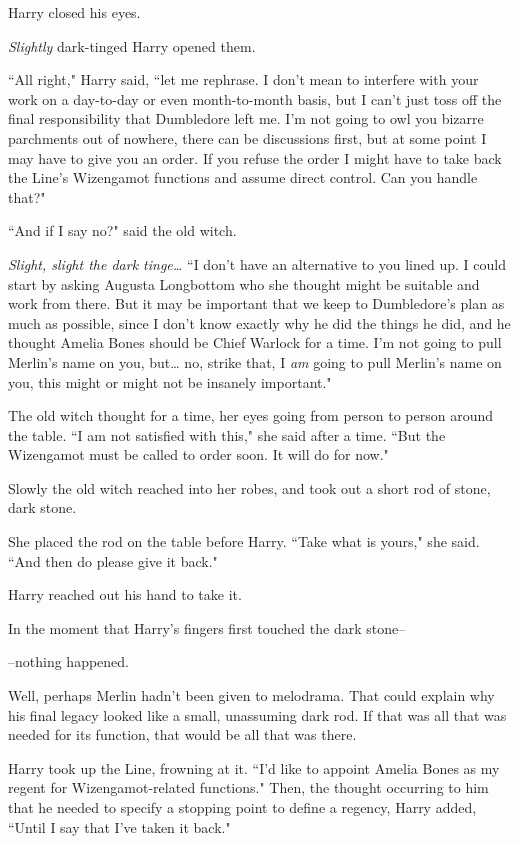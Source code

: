 Harry closed his eyes.

\emph{Slightly} dark-tinged Harry opened them.

``All right," Harry said, ``let me rephrase. I don't mean to interfere with your work on a day-to-day or even month-to-month basis, but I can't just toss off the final responsibility that Dumbledore left me. I'm not going to owl you bizarre parchments out of nowhere, there can be discussions first, but at some point I may have to give you an order. If you refuse the order I might have to take back the Line's Wizengamot functions and assume direct control. Can you handle that?"

``And if I say no?" said the old witch.

\emph{Slight, slight the dark tinge{\ldots}} ``I don't have an alternative to you lined up. I could start by asking Augusta Longbottom who she thought might be suitable and work from there. But it may be important that we keep to Dumbledore's plan as much as possible, since I don't know exactly why he did the things he did, and he thought Amelia Bones should be Chief Warlock for a time. I'm not going to pull Merlin's name on you, but{\ldots} no, strike that, I \emph{am} going to pull Merlin's name on you, this might or might not be insanely important."

The old witch thought for a time, her eyes going from person to person around the table. ``I am not satisfied with this," she said after a time. ``But the Wizengamot must be called to order soon. It will do for now."

Slowly the old witch reached into her robes, and took out a short rod of stone, dark stone.

She placed the rod on the table before Harry. ``Take what is yours," she said. ``And then do please give it back."

Harry reached out his hand to take it.

In the moment that Harry's fingers first touched the dark stone\---

\---nothing happened.

Well, perhaps Merlin hadn't been given to melodrama. That could explain why his final legacy looked like a small, unassuming dark rod. If that was all that was needed for its function, that would be all that was there.

Harry took up the Line, frowning at it. ``I'd like to appoint Amelia Bones as my regent for Wizengamot-related functions." Then, the thought occurring to him that he needed to specify a stopping point to define a regency, Harry added, ``Until I say that I've taken it back."

